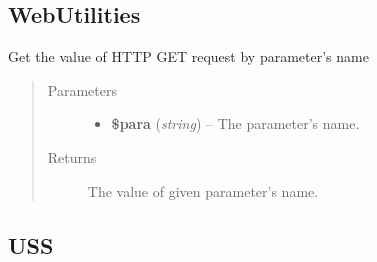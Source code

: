 \documentclass[letterpaper,10pt,english]{sphinxmanual}
\begin{document}
\subsection{WebUtilities}
\label{docs/api:webutilities}

\begin{fulllineitems}
\label{docs/api:GetParameter}
Get the value of HTTP GET request by parameter's name
\begin{quote}\begin{description}
\item[{Parameters}] \leavevmode\begin{itemize}
\item {} 
\textbf{\$para} (\emph{string}) -- The parameter's name.

\end{itemize}

\item[{Returns}] \leavevmode
The value of given parameter's name.

\end{description}\end{quote}

\end{fulllineitems}



\subsection{USS}
\label{docs/api:uss}
\end{document}
